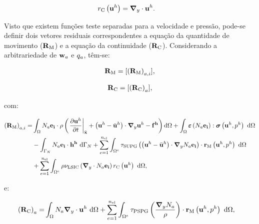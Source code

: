\noindent

\begin{align}
	{r}_{\mathrm{C}}\left(\mathbf{u}^h\right)&=\boldsymbol{\nabla}_y \cdot \mathbf{u}^h.
\end{align}

Visto que existem funções teste separadas para a velocidade e pressão, pode-se definir dois vetores residuais correspondentes a equação da quantidade de movimento ($\mathbf{R}_\mathrm{M}$) e a equação da continuidade ($\mathbf{R}_\mathrm{C}$). Considerando a arbitrariedade de $\mathbf{w}_{a}$ e $q_{a}$, têm-se:

\begin{align}
	\mathbf{R}_\mathrm{M}  = [\left(\mathbf{R}_\mathrm{M}\right)_{a,i}],
\end{align}

\begin{align}
	\mathbf{R}_\mathrm{C} =  [\left(\mathbf{R}_\mathrm{C}\right)_{a}],
\end{align}

\noindent com:

\begin{align}
	\begin{split}
		\left(\NNSM\right)_{a,i} =&\int_{\domain} \shapef_{a}\mathbf{e_i} \cdot \density\left(\left. \frac{\partial\velocityh}{\partial t}\right|_{\posALE}+\left(\velocityh - \velocityALEh \right)\cdot \gradient \velocityh - \sbodyforceh\right) \deriv \domain +\int_{\domain} \straintensor \left(\shapef_{a}\mathbf{e_i}\right) : \stressTensor \left(\velocityh,\pressh\right)\ \deriv \domain\\ &
		- \int_{\boundaryN}\shapef_{a}\mathbf{e_i} \cdot \surfaceLoadh \ \deriv \boundaryN 
		+ \sum_{e=1}^{\nel} \int_{\domainE} \SUPG \left(\left(\velocityh - \velocityALEh \right) \cdot \gradient \shapef_{a}\mathbf{e_i}\right) \cdot \resMom\left(\velocityh,\pressh \right)\  \deriv \domain\\
		&+ \sum_{e=1}^{\nel} \int_{\domainE} \density \LSIC \left(\divergence \cdot \shapef_{a}\mathbf{e_i}\right) \resPre\left(\velocityh\right)\  \deriv \domain  ,
	\end{split}
\end{align}

\noindent e:

\begin{align}
	\begin{split}
		\left(\mathbf{R}_\mathrm{C}\right)_{a} = &\int_{\Omega} N_{a} \boldsymbol{\nabla}_y \cdot \mathbf{u}^h \ \mathrm{d} \Omega  
		+ \sum_{e=1}^{n_{\mathrm{el}}} \int_{\Omega^e} \tau_{\mathrm{PSPG}} \left(\frac{\boldsymbol{\nabla}_y N_{a}}{\rho}\right) \cdot \mathbf{r}_{\mathrm{M}}\left(\mathbf{u}^h,p^h\right) \  \mathrm{d} \Omega,
	\end{split}
\end{align}

